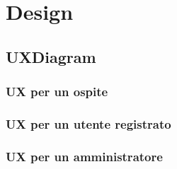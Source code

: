 \section{Design}
\subsection{UXDiagram}
\subsubsection{UX per un ospite}
\subsubsection{UX per un utente registrato}
\subsubsection{UX per un amministratore}